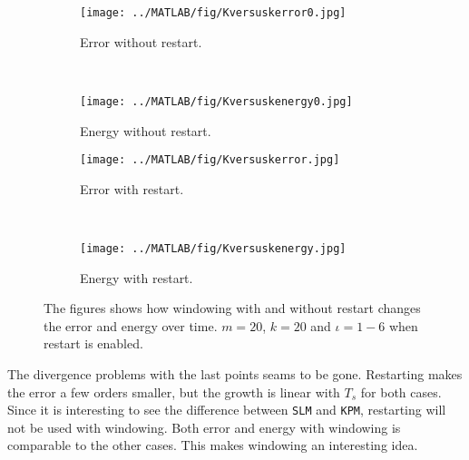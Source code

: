 \begin{figure}[H]
        \centering
        \begin{subfigure}[b]{0.45\textwidth}
                \texttt{[image: ../MATLAB/fig/Kversuskerror0.jpg]}
                \caption{ Error without restart. }
                \label{fig:Kversuskerror0}
        \end{subfigure}
		~
		\begin{subfigure}[b]{0.45\textwidth}
                \texttt{[image: ../MATLAB/fig/Kversuskenergy0.jpg]}
                \caption{ Energy without restart. }
                \label{fig:Kversuskenergy0}
        \end{subfigure}

        \begin{subfigure}[b]{0.45\textwidth}
                \texttt{[image: ../MATLAB/fig/Kversuskerror.jpg]}
                \caption{ Error with restart. }
                \label{fig:Kversuskerror}
        \end{subfigure}
		~
		\begin{subfigure}[b]{0.45\textwidth}
                \texttt{[image: ../MATLAB/fig/Kversuskenergy.jpg]}
                \caption{ Energy with restart. }
                \label{fig:Kversuskenergy}
        \end{subfigure}        
        
        \caption{ The figures shows how windowing with and without restart changes the error and energy over time. $m = 20$, $k= 20$ and $\iota = 1-6$ when restart is enabled. }
        \label{fig:Kversusk}
\end{figure}
The divergence problems with the last points seams to be gone. Restarting makes the error a few orders smaller, but the growth is linear with $T_s$ for both cases. Since it is interesting to see the difference between \texttt{SLM} and \texttt{KPM}, restarting will not be used with windowing.
Both error and energy with windowing is comparable to the other cases. This makes windowing an interesting idea.

